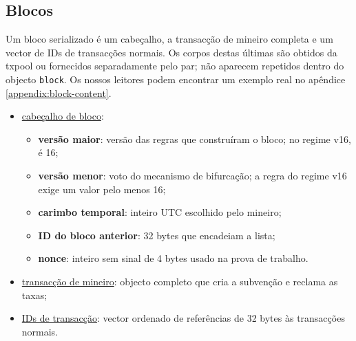 \subsection{Blocos}
\label{subsec:blocks}


Um bloco serializado é um cabeçalho, a transacção de mineiro completa e um
vector de IDs de transacções normais. Os corpos destas últimas são obtidos da
txpool ou fornecidos separadamente pelo par; não aparecem repetidos dentro do
objecto {\tt block}. Os nossos leitores podem encontrar um exemplo real no
apêndice \ref{appendix:block-content}.

\begin{itemize}
\item \underline{cabeçalho de bloco}:
    \begin{itemize}
        \item \textbf{versão maior}: versão das regras que construíram o
              bloco; no regime v16, é 16;
        \item \textbf{versão menor}: voto do mecanismo de bifurcação; a regra
              do regime v16 exige um valor pelo menos 16;
        \item \textbf{carimbo temporal}: inteiro UTC escolhido pelo mineiro;
        \item \textbf{ID do bloco anterior}: 32 bytes que encadeiam a lista;
        \item \textbf{nonce}: inteiro sem sinal de 4 bytes usado na prova de
              trabalho.
    \end{itemize}
    \item \underline{transacção de mineiro}: objecto completo que cria a
          subvenção e reclama as taxas;
    \item \underline{IDs de transacção}: vector ordenado de referências de 32
          bytes às transacções normais.

\end{itemize}
\vspace{.05cm}

